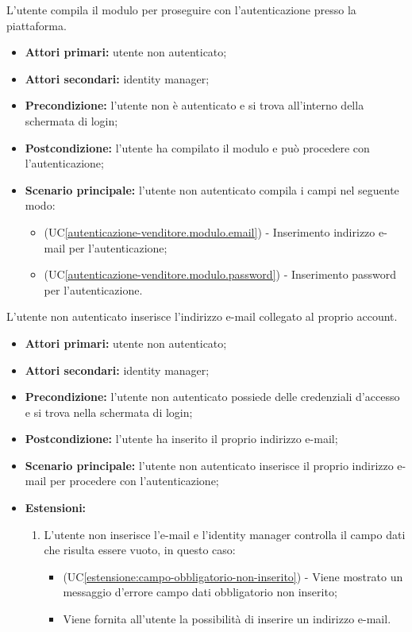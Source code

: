 L'utente compila il modulo per proseguire con l'autenticazione presso la piattaforma.
\begin{itemize}
	\item \textbf{Attori primari:} utente non autenticato;
	\item \textbf{Attori secondari:} identity manager;
	\item \textbf{Precondizione:} l'utente non è autenticato e si trova all'interno della schermata di login;
	\item \textbf{Postcondizione:} l'utente ha compilato il modulo e può procedere con l'autenticazione;
	\item \textbf{Scenario principale:} l'utente non autenticato compila i campi nel seguente modo:
	\begin{itemize}
		\item (UC\ref{autenticazione-venditore.modulo.email}) - Inserimento indirizzo e-mail per l'autenticazione;
		\item (UC\ref{autenticazione-venditore.modulo.password}) - Inserimento password per l'autenticazione.
	\end{itemize}
\end{itemize}

\label{autenticazione-venditore.modulo.email}

L'utente non autenticato inserisce l'indirizzo e-mail collegato al proprio account.
\begin{itemize}
	\item \textbf{Attori primari:} utente non autenticato;
	\item \textbf{Attori secondari:} identity manager;
	\item \textbf{Precondizione:} l'utente non autenticato possiede delle credenziali d'accesso e si trova nella schermata di login;
	\item \textbf{Postcondizione:}  l'utente ha inserito il proprio indirizzo e-mail;
	\item \textbf{Scenario principale:} l'utente non autenticato inserisce il proprio indirizzo e-mail per procedere con l'autenticazione;
	\item \textbf{Estensioni:}
	\begin{enumerate}[label=\lett]
		\item L'utente non inserisce l'e-mail e l'identity manager controlla il campo dati che risulta essere vuoto, in questo caso:
		\begin{itemize}
			\item (UC\ref{estensione:campo-obbligatorio-non-inserito}) - Viene mostrato un messaggio d'errore campo dati obbligatorio non inserito;
			\item Viene fornita all'utente la possibilità di inserire un indirizzo e-mail.
		\end{itemize}
	\end{enumerate}
\end{itemize}

